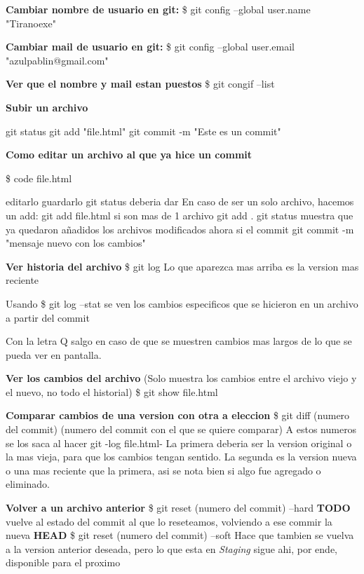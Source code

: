 \documentclass[]{article} %
\begin{document}
\begin{center}
  
\textbf{Cambiar nombre de usuario en git:}
  \$ git config --global user.name "Tiranoexe"

\textbf{Cambiar mail de usuario en git:}
  \$ git config --global user.email "azulpablin@gmail.com"

\textbf{Ver que el nombre y mail estan puestos}
  \$ git congif --list
 

\textbf{Subir un archivo}

git status
git add "file.html"
git commit -m "Este es un commit"


\textbf{Como editar un archivo al que ya hice un commit}

  \$ code file.html

  editarlo
  guardarlo
  git status
  deberia dar 
  En caso de ser un solo archivo, hacemos un add:
  git add file.html
  si son mas de 1 archivo
  git add . 
  git status muestra que ya quedaron añadidos los archivos modificados
  ahora si el commit
  git commit -m "mensaje nuevo con los cambios"

\textbf{Ver historia del archivo}
\$ git log 
Lo que aparezca mas arriba es la version mas reciente

Usando \$ git log --stat se ven los cambios especificos que se hicieron en un archivo a partir del commit 

Con la letra Q salgo en caso de que se muestren cambios mas largos de lo que se pueda ver en pantalla.

\textbf{Ver los cambios del archivo} 
(Solo muestra los cambios entre el archivo viejo y el nuevo, no todo el historial)
\$ git show file.html

\textbf{Comparar cambios de una version con otra a eleccion}
\$ git diff (numero del commit) (numero del commit con el que se quiere comparar)
A estos numeros se los saca al hacer git -log file.html-
La primera deberia ser la version original o la mas vieja, para que los cambios tengan sentido.
La segunda es la version nueva o una mas reciente que la primera, asi se nota bien si algo fue agregado o eliminado.


\textbf{Volver a un archivo anterior}
\$ git reset (numero del commit) --hard \textbf{TODO} vuelve al estado del commit al que lo reseteamos, volviendo a ese commir la nueva \textbf{HEAD}
\$ git reset (numero del commit) --soft Hace que tambien se vuelva a la version anterior deseada, pero lo que esta en \textit{Staging} sigue ahi, por ende, disponible para el proximo  
 



\end{center}
\end{document}

